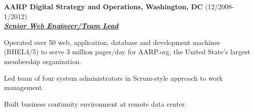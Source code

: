 \documentclass{article}
\newcommand{\employer}[3]{{ \textbf{#1} (#2)\\ \underline{\textbf{\emph{#3}}}\\ \nopagebreak }}
\newenvironment{achievements}{\begin{list}{\topsep 0pt \itemsep -2pt}} {\vspace*{4pt}\end{list}}
\begin{document}
\employer{AARP Digital Strategy and Operations, Washington, DC}{12/2008-1/2012}{Senior Web Engineer/Team Lead}
\begin{achievements}
  \item Operated over 50 web, application, database and development machines (RHEL4/5) to serve 3 million pages/day for AARP.org, the United State's largest membership organization.
  \item Led team of four system administrators in Scrum-style approach to work management.
  \item Built business continuity environment at remote data center.
\end{achievements}
\end{document}
